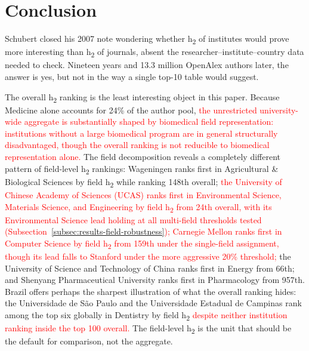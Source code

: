 \section{Conclusion}
\label{sec:conclusion}
Schubert closed his 2007 note wondering whether h\textsubscript{2} of institutes would prove more interesting than h\textsubscript{2} of journals, absent the researcher--institute--country data needed to check. Nineteen years and 13.3 million OpenAlex authors later, the answer is yes, but not in the way a single top-10 table would suggest.

The overall h\textsubscript{2} ranking is the least interesting object in this paper. Because Medicine alone accounts for 24\% of the author pool, \textcolor{red}{the unrestricted university-wide aggregate is substantially shaped by biomedical field representation: institutions without a large biomedical program are in general structurally disadvantaged, though the overall ranking is not reducible to biomedical representation alone.} The field decomposition reveals a completely different pattern of field-level h\textsubscript{2} rankings: Wageningen ranks first in Agricultural \& Biological Sciences by field h\textsubscript{2} while ranking 148th overall; \textcolor{red}{the University of Chinese Academy of Sciences (UCAS) ranks first in Environmental Science, Materials Science, and Engineering by field h\textsubscript{2} from 24th overall, with its Environmental Science lead holding at all multi-field thresholds tested (Subsection~\ref{subsec:results-field-robustness}); Carnegie Mellon ranks first in Computer Science by field h\textsubscript{2} from 159th under the single-field assignment, though its lead falls to Stanford under the more aggressive 20\% threshold;} the University of Science and Technology of China ranks first in Energy from 66th; and Shenyang Pharmaceutical University ranks first in Pharmacology from 957th. Brazil offers perhaps the sharpest illustration of what the overall ranking hides: the Universidade de S\~{a}o Paulo and the Universidade Estadual de Campinas rank among the top six globally in Dentistry by field h\textsubscript{2} \textcolor{red}{despite neither institution ranking inside the top 100 overall.} The field-level h\textsubscript{2} is the unit that should be the default for comparison, not the aggregate.


